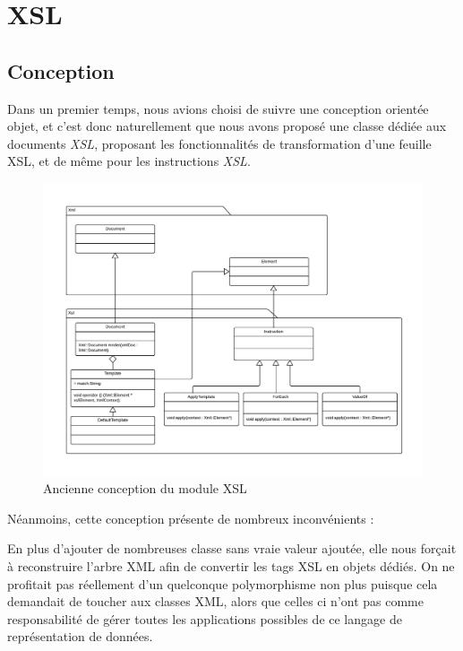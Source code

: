 \chapter{XSL}

\section{Conception}

Dans un premier temps, nous avions choisi de suivre une conception orientée objet, et c'est donc
naturellement que nous avons proposé une classe dédiée aux documents \textit{XSL}, proposant les
fonctionnalités de transformation d'une feuille XSL, et de même pour les instructions \textit{XSL}.

\begin{figure}[h!]
    \centering
    \includegraphics[width=\linewidth]{images/xsl-uml-old.pdf}
    \caption{Ancienne conception du module XSL}
    \label{oldXslClassDiagram}
\end{figure}

Néanmoins, cette conception présente de nombreux inconvénients :

En plus d'ajouter de nombreuses classe sans vraie valeur ajoutée, elle nous forçait à reconstruire l'arbre XML afin de convertir les tags
XSL en objets dédiés. On ne profitait pas réellement d'un quelconque polymorphisme non plus puisque cela demandait de toucher aux classes
XML, alors que celles ci n'ont pas comme responsabilité de gérer toutes les applications possibles de ce langage de représentation de données.


